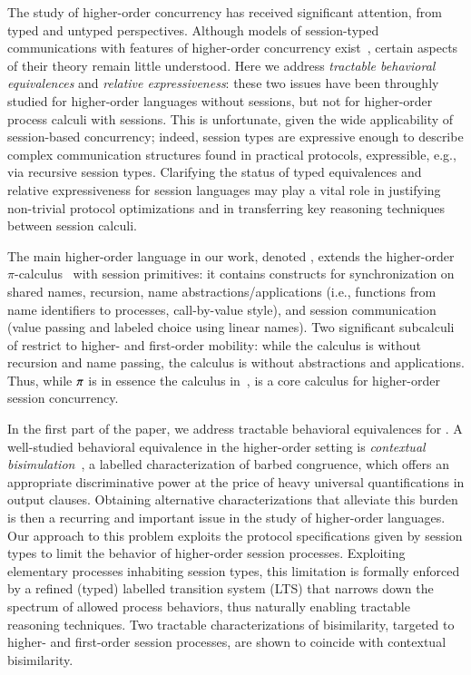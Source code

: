 The study of higher-order concurrency has received significant attention, 
from typed and untyped perspectives.
Although models of session-typed 
communications with features of higher-order concurrency exist~\cite{tlca07,DBLP:journals/jfp/GayV10},
certain aspects of their theory 
remain little understood. Here we address
 \emph{tractable behavioral equivalences} and \emph{relative expressiveness}:
these two issues 
have been throughly studied
for higher-order languages without sessions,
but not for higher-order process calculi with sessions.
This is unfortunate, given the wide applicability of session-based concurrency; indeed,
session types are expressive enough to describe complex 
communication structures found in practical protocols,  expressible, e.g., via recursive session types.
Clarifying the status of typed equivalences and relative expressiveness for session languages
may play a vital role in justifying non-trivial protocol optimizations and in transferring key reasoning techniques between session calculi.

The main higher-order language in our work, denoted \HOp,
extends the higher-order $\pi$-calculus~\cite{SangiorgiD:expmpa} with session primitives:
it contains constructs for 
synchronization on shared names, 
recursion, 
name abstractions/applications (i.e., functions from name identifiers to processes, call-by-value style),
and session communication (value passing and
labeled choice using linear names). 
Two significant subcalculi of \HOp restrict to higher- and first-order mobility:
while the \HO calculus is \HOp without recursion and name passing,
the \sessp calculus is \HOp without abstractions and applications.
Thus, 
while $\pi$ is in essence the calculus in~\cite{honda.vasconcelos.kubo:language-primitives}, 
\HO  is  a core calculus for higher-order session concurrency.

In the first part of the paper, we address tractable behavioral equivalences
for \HOp.
A well-studied behavioral equivalence in the higher-order setting 
is \emph{contextual bisimulation}~\cite{San96H},
a labelled characterization of barbed congruence, 
which offers an appropriate discriminative power at the price of heavy universal quantifications in output clauses.
Obtaining alternative characterizations that alleviate this burden
is then a recurring and important issue 
in the study of higher-order languages.
Our approach to this problem 
exploits the protocol specifications given by session types to  limit 
the behavior of higher-order session processes. 
Exploiting elementary processes inhabiting session types, 
this limitation is formally enforced by 
a refined (typed) labelled transition system (LTS)
that narrows down the spectrum of allowed process behaviors, 
thus naturally enabling tractable reasoning techniques. 
Two tractable characterizations of bisimilarity, 
targeted to higher- and first-order session processes,
are shown to coincide with contextual bisimilarity.

